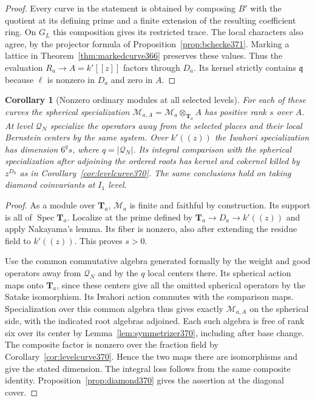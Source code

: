 \documentclass[a4paper,11pt]{article}
\newtheorem{corollary}[proposition]{Corollary}
\theoremstyle{definition}
\theoremstyle{remark}
\numberwithin{equation}{section}
\begin{document}
\begin{proof}
Every curve in the statement is obtained by composing
\(B'\) with the quotient at its defining prime and a finite
extension of the resulting coefficient ring. On \(G_L\)
this composition gives its restricted trace. The local
characters also agree, by the projector formula of
Proposition~\ref{prop:bchecke371}. Marking a
lattice in Theorem~\ref{thm:markedcurve366} preserves these
values. Thus the evaluation \(R_a\to A=k'[[z]]\) factors
through \(D_a\). Its kernel strictly contains \(\mathfrak q\)
because \(\ell\) is nonzero in \(D_a\)
and zero in \(A\).
\end{proof}

\begin{corollary}[Nonzero ordinary modules at all selected levels]
\label{cor:curvesupp371}
For each of these curves the spherical specialization
\(\mathcal M_{a,A}=\mathcal M_a\otimes_{\mathbf T_a}A\)
has positive rank \(s\) over \(A\). At level \(\mathcal Q_N\)
specialize the operators away from the selected places and
their local Bernstein centers by the same system. Over
\(k'((z))\) the Iwahori specialization has dimension
\(6^q s\), where \(q=|\mathcal Q_N|\). Its integral comparison
with the spherical specialization after adjoining the ordered
roots has kernel and cokernel killed by \(z^{D_0}\) as in
Corollary~\ref{cor:levelcurve370}. The same conclusions
hold on taking diamond coinvariants at \(I_1\) level.
\end{corollary}
\begin{proof}
As a module over \(\mathbf T_a\), \(\mathcal M_a\) is finite
and faithful by construction. Its support is all of
\(\operatorname{Spec}\mathbf T_a\). Localize at the prime
defined by \(\mathbf T_a\to D_a\to k'((z))\) and apply
Nakayama's lemma. Its fiber is nonzero, also after extending
the residue field to \(k'((z))\). This proves \(s>0\).

Use the common commutative algebra generated formally by
the weight and good operators away from \(\mathcal Q_N\)
and by the \(q\) local centers there. Its spherical action
maps onto \(\mathbf T_a\), since these centers give all the
omitted spherical operators by the Satake isomorphism.
Its Iwahori action commutes with the comparison maps.
Specialization over this common algebra thus gives exactly
\(\mathcal M_{a,A}\) on the spherical side, with the indicated
root algebras adjoined. Each such algebra is free of rank
six over its center by Lemma~\ref{lem:symmetrizer370},
including after base change. The composite factor is
nonzero over the fraction field by
Corollary~\ref{cor:levelcurve370}. Hence the two maps there
are isomorphisms and give the stated dimension. The integral
loss follows from the same composite identity.
Proposition~\ref{prop:diamond370} gives the assertion at
the diagonal cover.
\end{proof}
\end{document}

